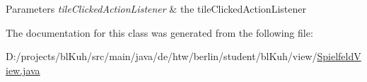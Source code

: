 \begin{DoxyParams}{Parameters}
{\em tile\-Clicked\-Action\-Listener} & the tile\-Clicked\-Action\-Listener \\
\hline
\end{DoxyParams}


The documentation for this class was generated from the following file\-:\begin{DoxyCompactItemize}
\item 
D\-:/projects/bl\-Kuh/src/main/java/de/htw/berlin/student/bl\-Kuh/view/\hyperlink{_spielfeld_view_8java}{Spielfeld\-View.\-java}\end{DoxyCompactItemize}
